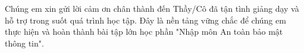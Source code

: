 
\thesislayout



\begin{titlepage}
\centering
\coverpage
\end{titlepage}


\frontmatter

\begin{acknowledgments}
Chúng em xin gửi lời cảm ơn chân thành đến Thầy/Cô đã tận tình giảng dạy và hỗ trợ trong suốt quá trình học tập. Đây là nền tảng vững chắc để chúng em thực hiện và hoàn thành bài tập lớn học phần "Nhập môn An toàn bảo mật thông tin".
\end{acknowledgments}

\tableofcontents
\listoffigures
\listoftables
\listofalgorithms  %

\mainmatter
\fancyhead{}
\renewcommand{\footrulewidth}{0.4pt}
\pagestyle{fancy} 
\renewcommand{\chaptermark}[1]{\markboth{#1}{#1}}
\fancyhead[R]{\chaptername\ \thechapter\ --\ \leftmark}









